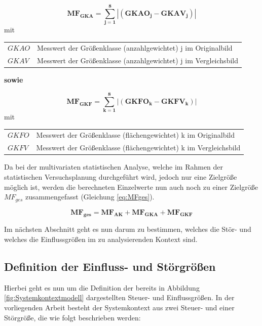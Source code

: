 \documentclass[
fontsize=10pt, 
listof = totoc,
parskip = half	
]{report}
\makeatletter
\newenvironment{conditions}
{\par\vspace{\abovedisplayskip}\noindent\begin{tabular}{>{$}l<{$} @{${}:{}$} l}}
	{\end{tabular}\par\vspace{\belowdisplayskip}}
\makeatother
\begin{document}
\begin{equation}\label{eq:MFGKa}
	\boxed{\mathbf{MF_{GKA} = \sum_{j=1}^{8} |\left(GKAO_j - GKAV_j\right)|}}
\end{equation}
mit
\begin{conditions}
	GKAO	&	Messwert der Größenklasse (anzahlgewichtet) j im Originalbild\\
	GKAV	&	Messwert der Größenklasse (anzahlgewichtet) j im Vergleichsbild
\end{conditions}

\noindent \textbf{sowie}

\begin{equation}\label{eq:MFGKf}
	\boxed{\mathbf{MF_{GKF} = \sum_{k=1}^{8} |\left(GKFO_k - GKFV_k\right)|}}
\end{equation}
mit
\begin{conditions}
	GKFO	&	Messwert der Größenklasse (flächengewichtet) k im Originalbild\\
	GKFV	&	Messwert der Größenklasse (flächengewichtet) k im  Vergleichsbild
\end{conditions}

\noindent Da bei der multivariaten statistischen Analyse, welche im Rahmen der statistischen Versuchsplanung durchgeführt wird, jedoch nur eine Zielgröße möglich ist, werden die berechneten Einzelwerte nun auch noch zu einer Zielgröße $MF_{ges}$ zusammengefasst (Gleichung \ref{eq:MFges}).

\begin{equation}\label{eq:MFges}
	\boxed{\mathbf{MF_{ges} = MF_{AK} + MF_{GKA} + MF_{GKF}}}
\end{equation}

\noindent Im nächsten Abschnitt geht es nun darum zu bestimmen, welches die Stör- und welches die Einflussgrößen im zu analysierenden Kontext sind.

\subsection{Definition der Einfluss- und Störgrößen}
\label{subsec:DefEinflusStoer}

Hierbei geht es nun um die Definition der bereits in Abbildung \ref{fig:Systemkontextmodell} dargestellten Steuer- und Einflussgrößen. In der vorliegenden Arbeit besteht der Systemkontext aus zwei Steuer- und einer Störgröße, die wie folgt beschrieben werden:
\end{document}
